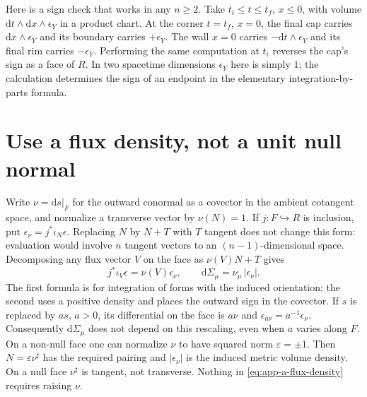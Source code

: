 Here is a sign check that works in any $n\geq2$. Take $t_i\leq t\leq t_f$, $x\leq0$, with volume $\mathrm{d}t\wedge\mathrm{d}x\wedge\epsilon_Y$ in a product chart. At the corner $t=t_f$, $x=0$, the final cap carries $\mathrm{d}x\wedge\epsilon_Y$ and its boundary carries $+\epsilon_Y$. The wall $x=0$ carries $-\mathrm{d}t\wedge\epsilon_Y$ and its final rim carries $-\epsilon_Y$. Performing the same computation at $t_i$ reverses the cap's sign as a face of $R$. In two spacetime dimensions $\epsilon_Y$ here is simply $1$; the calculation determines the sign of an endpoint in the elementary integration-by-parts formula.

\section{Use a flux density, not a unit null normal}

Write $\nu=\mathrm{d}s|_F$ for the outward conormal as a covector in the ambient cotangent space, and normalize a transverse vector by $\nu(N)=1$. If $j:F\hookrightarrow R$ is inclusion, put $\epsilon_\nu=j^*\iota_N\epsilon$. Replacing $N$ by $N+T$ with $T$ tangent does not change this form: evaluation would involve $n$ tangent vectors to an $(n-1)$-dimensional space. Decomposing any flux vector $V$ on the face as $\nu(V)N+T$ gives
\begin{equation}
 j^*\iota_V\epsilon=\nu(V)\epsilon_\nu,
 \qquad \mathrm{d}\Sigma_\mu=\nu_\mu\,|\epsilon_\nu| .
 \label{eq:app-a-flux-density}
\end{equation}
The first formula is for integration of forms with the induced orientation; the second uses a positive density and places the outward sign in the covector. If $s$ is replaced by $a s$, $a>0$, its differential on the face is $a\nu$ and $\epsilon_{a\nu}=a^{-1}\epsilon_\nu$. Consequently $\mathrm{d}\Sigma_\mu$ does not depend on this rescaling, even when $a$ varies along $F$. On a non-null face one can normalize $\nu$ to have squared norm $\varepsilon=\pm1$. Then $N=\varepsilon\nu^\sharp$ has the required pairing and $|\epsilon_\nu|$ is the induced metric volume density. On a null face $\nu^\sharp$ is tangent, not transverse. Nothing in \eqref{eq:app-a-flux-density} requires raising $\nu$.

